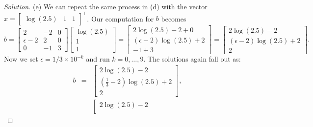 \documentclass[12pt]{amsart}
\newenvironment{solution}
{\begin{proof}[Solution]}
{\end{proof}}
\begin{document}
\begin{onehalfspace}
\begin{solution}
            (e) We can repeat the same process in (d) with the vector
            $x=[\begin{matrix} \log(2.5) & 1 & 1\end{matrix}]^\top$.
            Our computation for $b$ becomes
            \begin{displaymath}
                b = \left[\begin{matrix}
                              2 & -2 & 0\\
                              \epsilon-2 & 2 & 0 \\
                              0 & -1 & 3
                \end{matrix}\right]
                \left[\begin{matrix}
                          \log(2.5)\\
                          1\\
                          1
                \end{matrix}\right]
                = \left[\begin{matrix}
                            2\log(2.5) - 2 + 0\\
                            (\epsilon - 2)\log(2.5) + 2\\
                            -1 + 3
                \end{matrix}\right]
                = \left[\begin{matrix}
                            2\log(2.5) - 2\\
                            (\epsilon - 2)\log(2.5) + 2\\
                            2
                \end{matrix}\right].
            \end{displaymath}
            Now we set $\epsilon=1/3\times 10^{-k}$ and run $k=0,\ldots,9$.
            The solutions again fall out as:
            \begin{eqnarray*}
                b & = & \left[\begin{matrix}
                              2\log(2.5) - 2\\
                              (\frac{1}{3} - 2)\log(2.5) + 2\\
                              2
                \end{matrix}\right],\\
                 & & \left[\begin{matrix}
                               2\log(2.5) - 2\\

\end{matrix}
\end{eqnarray*}
\end{solution}
\end{onehalfspace}
\end{document}
